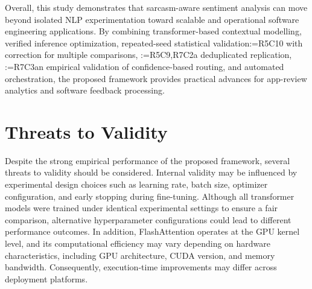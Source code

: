 \documentclass[a4paper,fleqn]{cas-sc}
\makeatletter
\newif\iftracked
\newcommand{\rv@setcolour}[1]{%
  \IfStrEq{#1}{R7C7}{\color{rvEdit}}{%
    \IfSubStr{#1}{R5}{\IfSubStr{#1}{R7}{\color{rvBoth}}{\color{rvFive}}}{\color{rvSeven}}}}
\newcommand{\rv@tag}[1]{\textsuperscript{\sffamily\bfseries\scriptsize[\StrSubstitute{#1}{,}{, }]}\,}
\newcommand{\rv@recordone}[1]{%
  \edef\rv@i{#1}%
  \ifcsdef{rv@n@\rv@i}{}{\csgdef{rv@n@\rv@i}{0}}%
  \csxdef{rv@n@\rv@i}{\the\numexpr\csuse{rv@n@\rv@i}+1\relax}%
  \begingroup\edef\@currentlabel{\rv@i}\label{rv:\rv@i:\csuse{rv@n@\rv@i}}\endgroup}
\newcommand{\rv@record}[1]{\@for\rv@id:=#1\do{\expandafter\rv@recordone\expandafter{\rv@id}}}
\DeclareRobustCommand{\rc}[2]{\rv@record{#1}\iftracked{\rv@setcolour{#1}\rv@tag{#1}#2}\else#2\fi}
\makeatother
\begin{document}
Overall, this study demonstrates that sarcasm-aware sentiment analysis can move beyond isolated NLP experimentation toward scalable and operational software engineering applications. By combining transformer-based contextual modelling, verified inference optimization, repeated-seed statistical validation\rc{R5C10}{ with correction for multiple comparisons}, \rc{R5C9,R7C2}{a deduplicated replication, }\rc{R7C3}{an empirical validation of confidence-based routing, }and automated orchestration, the proposed framework provides practical advances for app-review analytics and software feedback processing.

\section{Threats to Validity}
\label{sec:threats}
Despite the strong empirical performance of the proposed framework, several threats to validity should be considered. Internal validity may be influenced by experimental design choices such as learning rate, batch size, optimizer configuration, and early stopping during fine-tuning. Although all transformer models were trained under identical experimental settings to ensure a fair comparison, alternative hyperparameter configurations could lead to different performance outcomes. In addition, FlashAttention operates at the GPU kernel level, and its computational efficiency may vary depending on hardware characteristics, including GPU architecture, CUDA version, and memory bandwidth. Consequently, execution-time improvements may differ across deployment platforms.
\end{document}
